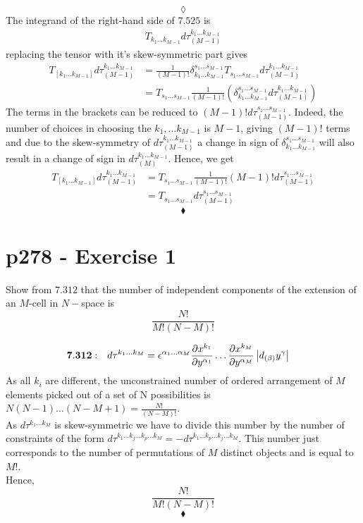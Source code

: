 $$\lozenge$$
The integrand of the right-hand side of $\mathbf{7.525}$ is
\begin{align}
T_{k_1\dots k_{M-1}}d\tau_{(M-1)}^{k_1\dots k_{M-1}}
\end{align}
replacing the tensor with it's skew-symmetric part gives
\begin{align}
T_{\left [k_1 \dots k_{M-1}\right ]}d\tau_{(M-1)}^{k_1\dots k_{M-1}}&= \frac{1}{\left(M-1\right)!}\delta_{k_1 \dots k_{M-1}}^{s_1 \dots s_{M-1}} T_{s_1\dots s_{M-1}}d\tau_{(M-1)}^{k_1\dots k_{M-1}}\\
&= T_{s_1\dots s_{M-1}}\frac{1}{\left(M-1\right)!} \left(\delta_{k_1 \dots k_{M-1}}^{s_1 \dots s_{M-1}}d\tau_{(M-1)}^{k_1\dots k_{M-1}}\right)
\end{align}
The terms in the brackets can be reduced to $\left(M-1\right)! d\tau_{(M-1)}^{s_1\dots s_{M-1}}$. Indeed, the number of choices in choosing the $k_1,\dots k_{M-1}$ is $M-1$, giving $\left(M-1\right)!$ terms  and due to the skew-symmetry of $d\tau_{(M-1)}^{k_1\dots k_{M-1}}$   a change in sign of $\delta_{k_1 \dots k_{M-1}}^{s_1 \dots s_{M-1}}$ will also result in a change of sign in $d\tau_{(M)}^{k_1\dots k_{M-1}}$.
Hence, we get 
\begin{align}
T_{\left [k_1 \dots k_{M-1}\right ]}d\tau_{(M-1)}^{k_1\dots k_{M-1}}&=T_{s_1\dots s_{M-1}}\frac{1}{\left(M-1\right)!}\left(M-1\right)! d\tau_{(M-1)}^{s_1\dots s_{M-1}}\\
&= T_{s_1\dots s_{M-1}} d\tau_{(M-1)}^{s_1\dots s_{M-1}}
\end{align}
$$\blacklozenge$$
\newpage


\section{p278 - Exercise 1 }
\begin{tcolorbox}
Show from $\mathbf{7.312}$ that the number of independent components of the extension of an $M$-cell in $N-$space is
$$\frac{N!}{M!\left(N-M\right)!}$$
\end{tcolorbox}
\begin{align}
\mathbf{7.312:}\quad d\tau^{k_1\dots k_M}&= \epsilon^{\alpha_1 \dots \alpha_M}\pdv{x^{k_1}}{y^{\alpha_1}}\dots \pdv{x^{k_M}}{y^{\alpha_M}}\left|d_{(\beta)}y^{\gamma}\right|
\end{align}
As all $k_i$ are different, the unconstrained number of ordered arrangement of $M$ elements picked out of a set of N possibilities is $N(N-1)\dots (N-M+1) = \frac{N!}{\left(N-M\right)!}$.\\
As $d\tau^{k_1\dots k_M}$ is skew-symmetric we have to divide this number by the number of constraints of the form $d\tau^{k_1\dots k_j \dots k_p \dots k_M} = -d\tau^{k_1\dots k_p \dots k_j \dots k_M}$. This number just corresponds to the number of permutations of $M$ distinct objects and is equal to $M!$.\\
Hence,
$$\frac{N!}{M!\left(N-M\right)!}$$
$$\blacklozenge$$
\newpage



